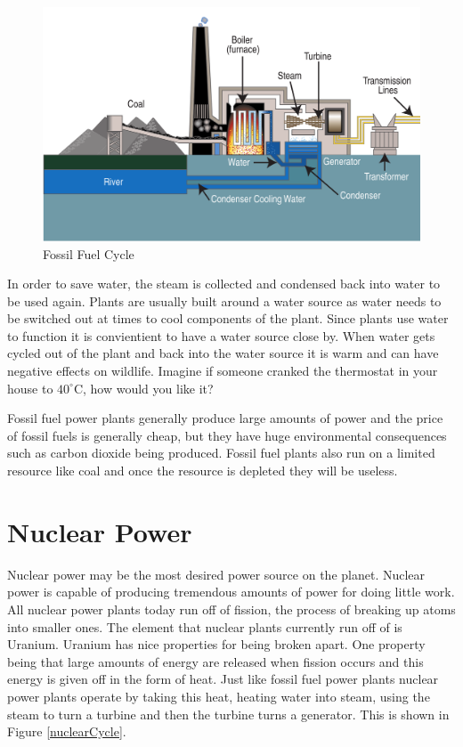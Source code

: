 \documentclass[msc,oneside]{ubcthesis}%
\begin{document}
 \begin{figure}[hbt] \label{FossilFuelCycle} 
    \begin{center}
      \includegraphics[width=1\textwidth]{fossil_fuel}
      \caption[Fossil Fuel Cycle]{Fossil Fuel Cycle \cite{Coal}}
    \end{center}
  \end{figure}

\newpage

In order to save water, the steam is collected and condensed back into water to be used again. Plants are 
usually built around a water source as water needs to be switched out at times to cool components of the plant. Since plants use water to function it is convientient to have a water source close by. When water gets cycled out of the plant and back into the water source it is warm and can have negative effects on wildlife. Imagine if someone cranked the thermostat in your house to $40^\circ$C, how would you like it?

Fossil fuel power plants generally produce large amounts of power and the price of fossil fuels is generally cheap, but they have huge environmental consequences such as carbon dioxide being produced. Fossil fuel plants also run on a limited resource like coal and once the resource is depleted they will be useless.

 \section{Nuclear Power}

 Nuclear power may be the most desired power source on the planet. Nuclear power is capable of producing tremendous amounts of power for doing little work. All nuclear power plants today run off of fission, the process of breaking up atoms into smaller ones. The element that nuclear plants currently run off of is Uranium. Uranium has nice properties for being broken apart. One property being that large amounts of energy are released when fission occurs and this energy is given off in the form of heat. Just like fossil fuel 
 power plants nuclear power plants operate by taking this heat, heating water into steam, using the steam 
 to turn a turbine and then the turbine turns a generator. This is shown in Figure \ref{nuclearCycle}.
\end{document}
